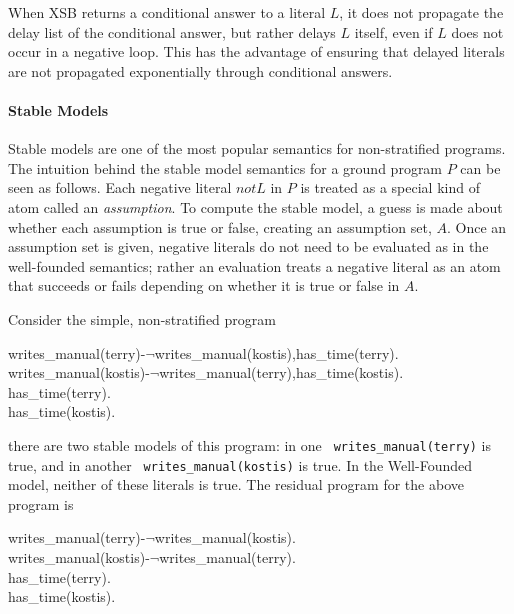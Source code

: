 When XSB returns a conditional answer to a literal $L$, it does not
propagate the delay list of the conditional answer, but rather delays
$L$ itself, even if $L$ does not occur in a negative loop.  This has
the advantage of ensuring that delayed literals are not propagated
exponentially through conditional answers.

\paragraph*{Stable Models}

Stable models are one of the most popular semantics for non-stratified
programs.  The intuition behind the stable model semantics for a
ground program $P$ can be seen as follows.  Each negative literal $not
L$ in $P$ is treated as a special kind of atom called an {\em
assumption}.  To compute the stable model, a guess is made about
whether each assumption is true or false, creating an assumption set,
$A$.  Once an assumption set is given, negative literals do not need
to be evaluated as in the well-founded semantics; rather an evaluation
treats a negative literal as an atom that succeeds or fails depending
on whether it is true or false in $A$.

\begin{example}
Consider the simple, non-stratified program
\begin{center}
\begin{Prog}
writes\_manual(terry)-$\neg$writes\_manual(kostis),has\_time(terry). \\
writes\_manual(kostis)-$\neg$writes\_manual(terry),has\_time(kostis). \\
has\_time(terry). \\
has\_time(kostis). \\
\end{Prog}
\end{center}
there are two stable models of this program: in one {\tt
writes\_manual(terry)} is true, and in another {\tt
writes\_manual(kostis)} is true.  In the Well-Founded model, neither
of these literals is true.  The residual program for the above program
is
\begin{center}
\begin{Prog}
writes\_manual(terry)-$\neg$writes\_manual(kostis). \\
writes\_manual(kostis)-$\neg$writes\_manual(terry). \\
has\_time(terry). \\
has\_time(kostis). \\
\end{Prog}
\end{center}
\end{example}


